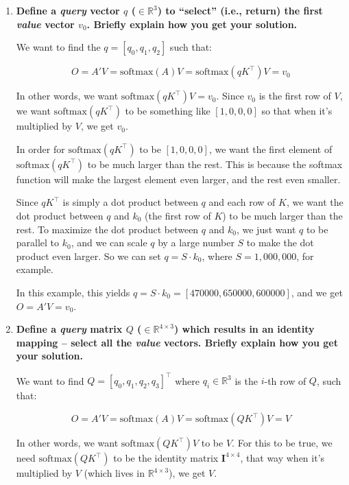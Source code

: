 \documentclass{article}
\begin{document}
\begin{enumerate}
    \item \textbf{Define a \textit{query} vector $q$ ($\in \mathbb{R}^3$) to
    ``select'' (i.e., return) the first \textit{value} vector $v_0$. Briefly
    explain how you get your solution.}

    We want to find the $q = [q_0, q_1, q_2]$ such that:

    $$O = A' V = \text{softmax}(A) V = \text{softmax}(q K^\top) V = v_0$$

    In other words, we want $\text{softmax}(q K^\top) V = v_0$. Since $v_0$ is
    the first row of $V$, we want $\text{softmax}(q K^\top)$ to be something
    like $[1, 0, 0, 0]$ so that when it's multiplied by $V$, we get $v_0$.

    In order for $\text{softmax}(q K^\top)$ to be $[1, 0, 0, 0]$, we want the
    first element of $\text{softmax}(q K^\top)$ to be much larger than the rest.
    This is because the softmax function will make the largest element even
    larger, and the rest even smaller.

    Since $q K^\top$ is simply a dot product between $q$ and each row of $K$, we
    want the dot product between $q$ and $k_0$ (the first row of $K$) to be much
    larger than the rest. To maximize the dot product between $q$ and $k_0$, we
    just want $q$ to be parallel to $k_0$, and we can scale $q$ by a large
    number $S$ to make the dot product even larger. So we can set $q = S \cdot
    k_0$, where $S = 1,000,000$, for example.

    In this example, this yields $\boxed{q = S \cdot k_0 = [470000, 650000,
    600000]}$, and we get $O = A' V = v_0$.


    \item \textbf{Define a \textit{query} matrix $Q$ ($\in \mathbb{R}^{4 \times
    3}$) which results in an identity mapping -- select all the \textit{value}
    vectors. Briefly explain how you get your solution.}

    We want to find $Q = [q_0, q_1, q_2, q_3]^\top$ where $q_i \in
    \mathbb{R}^{3}$ is the $i$-th row of $Q$, such that:

    $$O = A' V = \text{softmax}(A) V = \text{softmax}(Q K^\top)V = V$$

    In other words, we want $\text{softmax}(Q K^\top)V$ to be $V$. For this to
    be true, we need $\text{softmax}(Q K^\top)$ to be the identity matrix
    $\mathbf{I}^{4 \times 4}$, that way when it's multiplied by $V$ (which lives
    in $\mathbb{R}^{4 \times 3}$), we get $V$.


\end{enumerate}
\end{document}
